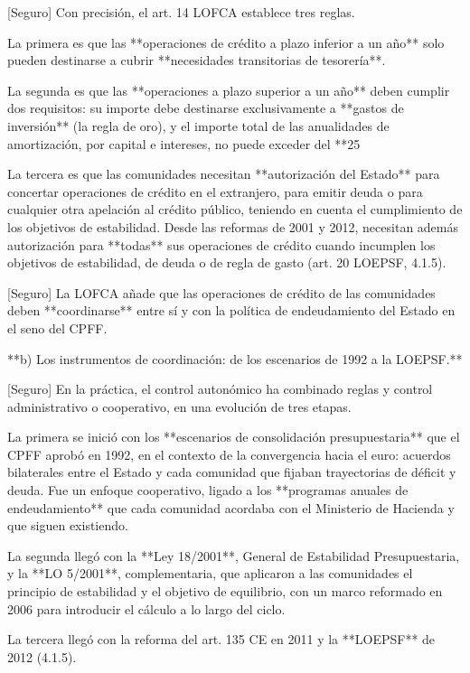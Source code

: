 \documentclass[10pt,a4paper]{article}
\begin{document}
[Seguro] Con precisión, el art. 14 LOFCA establece tres reglas.

La primera es que las **operaciones de crédito a plazo inferior a un año** solo pueden destinarse a cubrir **necesidades transitorias de tesorería**.

La segunda es que las **operaciones a plazo superior a un año** deben cumplir dos requisitos: su importe debe destinarse exclusivamente a **gastos de inversión** (la regla de oro), y el importe total de las anualidades de amortización, por capital e intereses, no puede exceder del **25%

La tercera es que las comunidades necesitan **autorización del Estado** para concertar operaciones de crédito en el extranjero, para emitir deuda o para cualquier otra apelación al crédito público, teniendo en cuenta el cumplimiento de los objetivos de estabilidad. Desde las reformas de 2001 y 2012, necesitan además autorización para **todas** sus operaciones de crédito cuando incumplen los objetivos de estabilidad, de deuda o de regla de gasto (art. 20 LOEPSF, 4.1.5).

[Seguro] La LOFCA añade que las operaciones de crédito de las comunidades deben **coordinarse** entre sí y con la política de endeudamiento del Estado en el seno del CPFF.

**b) Los instrumentos de coordinación: de los escenarios de 1992 a la LOEPSF.**

[Seguro] En la práctica, el control autonómico ha combinado reglas y control administrativo o cooperativo, en una evolución de tres etapas.

La primera se inició con los **escenarios de consolidación presupuestaria** que el CPFF aprobó en 1992, en el contexto de la convergencia hacia el euro: acuerdos bilaterales entre el Estado y cada comunidad que fijaban trayectorias de déficit y deuda. Fue un enfoque cooperativo, ligado a los **programas anuales de endeudamiento** que cada comunidad acordaba con el Ministerio de Hacienda y que siguen existiendo.

La segunda llegó con la **Ley 18/2001**, General de Estabilidad Presupuestaria, y la **LO 5/2001**, complementaria, que aplicaron a las comunidades el principio de estabilidad y el objetivo de equilibrio, con un marco reformado en 2006 para introducir el cálculo a lo largo del ciclo.

La tercera llegó con la reforma del art. 135 CE en 2011 y la **LOEPSF** de 2012 (4.1.5).
\end{document}
